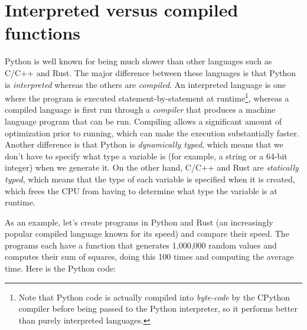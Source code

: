 \section{Interpreted versus compiled functions}

Python is well known for being much slower than other languages such as C/C++ and Rust.  The major difference between these languages is that Python is \textit{interpreted} whereas the others are \textit{compiled}.  An interpreted language is one where the program is executed statement-by-statement at runtime\footnote{Note that Python code is actually compiled into \textit{byte-code} by the CPython compiler before being passed to the Python interpreter, so it performs better than purely interpreted languages.}, whereas a compiled language is first run through a \textit{compiler} that produces a machine language program that can be run.  Compiling allows a significant amount of optimization prior to running, which can make the execution substantially faster.  Another difference is that Python is \textit{dynamically typed}, which means that we don't have to specify what type a variable is (for example, a string or a 64-bit integer) when we generate it. On the other hand, C/C++ and Rust are \textit{statically typed}, which means that the type of each variable is specified when it is created, which frees the CPU from having to determine what type the variable is at runtime.

As an example, let's create programs in Python and Rust (an increasingly popular compiled language known for its speed) and compare their speed.  The programs each have a function that generates 1,000,000 random values and computes their sum of squares, doing this 100 times and computing the average time.  Here is the Python code:

